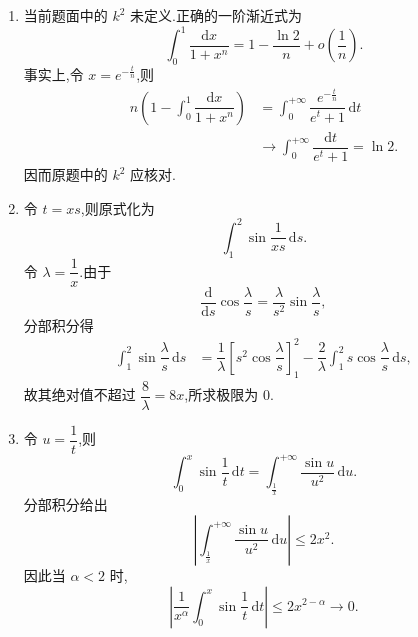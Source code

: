 \begin{solution}
    \leavevmode
    \begin{enumerate}
        \item 当前题面中的 $k^2$ 未定义.正确的一阶渐近式为
              \[
                  \displaystyle\int_0^1\dfrac{\mathrm{d}x}{1+x^n}
                  =1-\dfrac{\ln2}{n}+o\left(\dfrac{1}{n}\right).
              \]
              事实上,令 $x=e^{-\frac{t}{n}}$,则
              \[
                  \begin{aligned}
                      n\left(1-\int_0^1\dfrac{\mathrm{d}x}{1+x^n}\right)
                       & =\int_0^{+\infty}
                      \dfrac{e^{-\frac{t}{n}}}{e^t+1}\,\mathrm{d}t \\
                       & \longrightarrow\int_0^{+\infty}
                      \dfrac{\mathrm{d}t}{e^t+1}
                      =\ln2.
                  \end{aligned}
              \]
              因而原题中的 $k^2$ 应核对.

        \item 令 $t=xs$,则原式化为
              \[
                  \displaystyle\int_1^2\sin\dfrac{1}{xs}\,\mathrm{d}s.
              \]
              令 $\lambda=\dfrac{1}{x}$.由于
              \[
                  \dfrac{\mathrm{d}}{\mathrm{d}s}
                  \cos\dfrac{\lambda}{s}
                  =\dfrac{\lambda}{s^2}\sin\dfrac{\lambda}{s},
              \]
              分部积分得
              \[
                  \begin{aligned}
                      \int_1^2\sin\dfrac{\lambda}{s}\,\mathrm{d}s
                       & =\dfrac{1}{\lambda}
                      \left[s^2\cos\dfrac{\lambda}{s}\right]_1^2
                      -\dfrac{2}{\lambda}\int_1^2s\cos\dfrac{\lambda}{s}\,\mathrm{d}s,
                  \end{aligned}
              \]
              故其绝对值不超过 $\dfrac{8}{\lambda}=8x$,所求极限为 $0$.

        \item 令 $u=\dfrac{1}{t}$,则
              \[
                  \displaystyle\int_0^x\sin\dfrac{1}{t}\,\mathrm{d}t
                  =\int_{\frac{1}{x}}^{+\infty}\dfrac{\sin u}{u^2}\,\mathrm{d}u.
              \]
              分部积分给出
              \[
                  \left|\int_{\frac{1}{x}}^{+\infty}\dfrac{\sin u}{u^2}\,\mathrm{d}u\right|
                  \leq2x^2.
              \]
              因此当 $\alpha<2$ 时,
              \[
                  \left|\dfrac{1}{x^\alpha}
                  \int_0^x\sin\dfrac{1}{t}\,\mathrm{d}t\right|
                  \leq2x^{2-\alpha}\longrightarrow0.
              \]
    \end{enumerate}
\end{solution}
